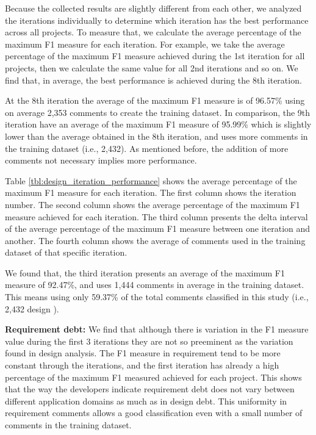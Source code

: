 Because the collected results are slightly different from each other, we analyzed the iterations individually to determine which iteration has the best performance across all projects. To measure that, we calculate the average percentage of the maximum F1 measure for each iteration. For example, we take the average percentage of the maximum F1 measure achieved during the 1st iteration for all projects, then we calculate the same value for all 2nd iterations and so on. We find that, in average, the best performance is achieved during the 8th iteration.

At the 8th iteration the average of the maximum F1 measure is of 96.57\% using on average 2,353 comments to create the training dataset. In comparison, the 9th iteration have an average of the maximum F1 measure of 95.99\% which is slightly lower than the average obtained in the 8th iteration, and uses more comments in the training dataset (i.e., 2,432). As mentioned before, the addition of more comments not necessary implies more performance.

Table \ref{tbl:design_iteration_performance} shows the average percentage of the maximum F1 measure for each iteration. The first column shows the iteration number. The second column shows the average percentage of the maximum F1 measure achieved for each iteration. The third column presents the delta interval of the average percentage of the maximum F1 measure between one iteration and another. The fourth column shows the average of comments used in the training dataset of that specific iteration.

We found that, the third iteration presents an average of the maximum F1 measure of 92.47\%, and uses 1,444 comments in average in the training dataset. This means using only 59.37\% of the total comments classified in this study (i.e., 2,432 design \SATD). 

\vspace{1mm}
\noindent \textbf{Requirement debt:} We find that although there is variation in the F1 measure value during the first 3 iterations they are not so preeminent as the variation found in design \SATD analysis. The F1 measure in requirement \SATD tend to be more constant through the iterations, and the first iteration has already a high percentage of the maximum F1 measured achieved for each project. This shows that the way the developers indicate requirement debt does not vary between different application domains as much as in design debt. This uniformity in requirement \SATD comments allows a good classification even with a small number of comments in the training dataset.  

